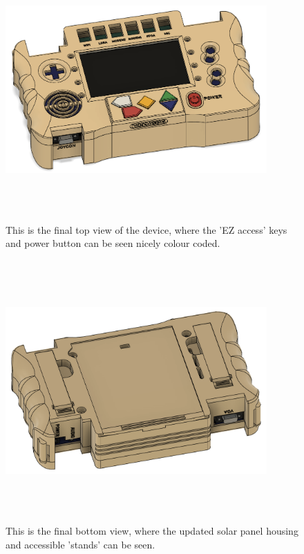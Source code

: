 \begin{figure} [h]
    \centering
    \includegraphics[width=10cm,height=10cm,keepaspectratio]{Figures/final_front_cad.png}
    \caption{This is the final top view of the device, where the 'EZ access' keys and power button can be seen nicely colour coded.}
    \label{fig:FinalTOP}
\end{figure}

\begin{figure} [h]
    \centering
    \includegraphics[width=10cm,height=10cm,keepaspectratio]{Figures/final_back_cad.png}
    \caption{This is the final bottom view, where the updated solar panel housing and accessible 'stands' can be seen.}
    \label{fig:FinalBOTTOM}
\end{figure}

